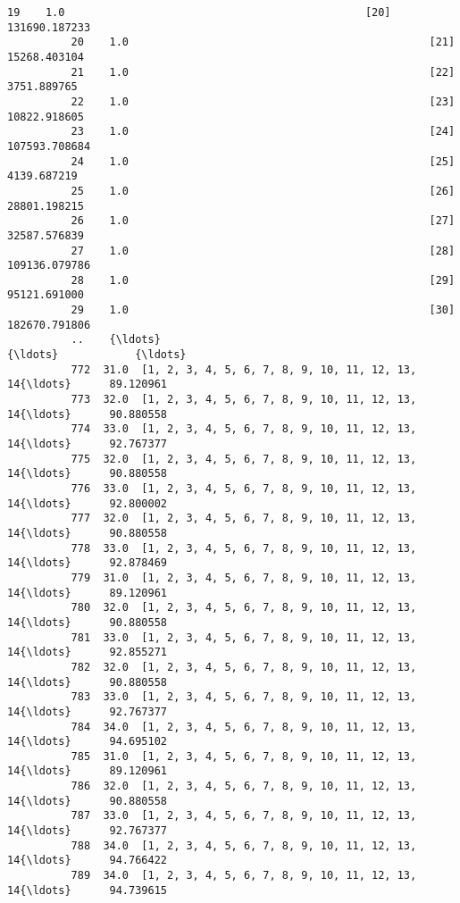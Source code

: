 \documentclass[11pt]{article}
\begin{document}
\begin{Verbatim}[commandchars=\\\{\}]
          19    1.0                                               [20]  131690.187233
          20    1.0                                               [21]   15268.403104
          21    1.0                                               [22]    3751.889765
          22    1.0                                               [23]   10822.918605
          23    1.0                                               [24]  107593.708684
          24    1.0                                               [25]    4139.687219
          25    1.0                                               [26]   28801.198215
          26    1.0                                               [27]   32587.576839
          27    1.0                                               [28]  109136.079786
          28    1.0                                               [29]   95121.691000
          29    1.0                                               [30]  182670.791806
          ..    {\ldots}                                                {\ldots}            {\ldots}
          772  31.0  [1, 2, 3, 4, 5, 6, 7, 8, 9, 10, 11, 12, 13, 14{\ldots}      89.120961
          773  32.0  [1, 2, 3, 4, 5, 6, 7, 8, 9, 10, 11, 12, 13, 14{\ldots}      90.880558
          774  33.0  [1, 2, 3, 4, 5, 6, 7, 8, 9, 10, 11, 12, 13, 14{\ldots}      92.767377
          775  32.0  [1, 2, 3, 4, 5, 6, 7, 8, 9, 10, 11, 12, 13, 14{\ldots}      90.880558
          776  33.0  [1, 2, 3, 4, 5, 6, 7, 8, 9, 10, 11, 12, 13, 14{\ldots}      92.800002
          777  32.0  [1, 2, 3, 4, 5, 6, 7, 8, 9, 10, 11, 12, 13, 14{\ldots}      90.880558
          778  33.0  [1, 2, 3, 4, 5, 6, 7, 8, 9, 10, 11, 12, 13, 14{\ldots}      92.878469
          779  31.0  [1, 2, 3, 4, 5, 6, 7, 8, 9, 10, 11, 12, 13, 14{\ldots}      89.120961
          780  32.0  [1, 2, 3, 4, 5, 6, 7, 8, 9, 10, 11, 12, 13, 14{\ldots}      90.880558
          781  33.0  [1, 2, 3, 4, 5, 6, 7, 8, 9, 10, 11, 12, 13, 14{\ldots}      92.855271
          782  32.0  [1, 2, 3, 4, 5, 6, 7, 8, 9, 10, 11, 12, 13, 14{\ldots}      90.880558
          783  33.0  [1, 2, 3, 4, 5, 6, 7, 8, 9, 10, 11, 12, 13, 14{\ldots}      92.767377
          784  34.0  [1, 2, 3, 4, 5, 6, 7, 8, 9, 10, 11, 12, 13, 14{\ldots}      94.695102
          785  31.0  [1, 2, 3, 4, 5, 6, 7, 8, 9, 10, 11, 12, 13, 14{\ldots}      89.120961
          786  32.0  [1, 2, 3, 4, 5, 6, 7, 8, 9, 10, 11, 12, 13, 14{\ldots}      90.880558
          787  33.0  [1, 2, 3, 4, 5, 6, 7, 8, 9, 10, 11, 12, 13, 14{\ldots}      92.767377
          788  34.0  [1, 2, 3, 4, 5, 6, 7, 8, 9, 10, 11, 12, 13, 14{\ldots}      94.766422
          789  34.0  [1, 2, 3, 4, 5, 6, 7, 8, 9, 10, 11, 12, 13, 14{\ldots}      94.739615

\end{Verbatim}
\end{document}
